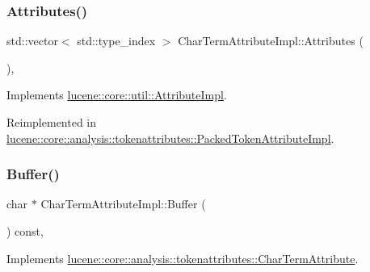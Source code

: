 \subsubsection{\texorpdfstring{Attributes()}{Attributes()}}
{\footnotesize\ttfamily std\+::vector$<$ std\+::type\+\_\+index $>$ Char\+Term\+Attribute\+Impl\+::\+Attributes (\begin{DoxyParamCaption}{ }\end{DoxyParamCaption})\hspace{0.3cm}{\ttfamily [override]}, {\ttfamily [virtual]}}



Implements \mbox{\hyperlink{classlucene_1_1core_1_1util_1_1AttributeImpl_ac0631e6a7a11044883bc97447716d7cc}{lucene\+::core\+::util\+::\+Attribute\+Impl}}.



Reimplemented in \mbox{\hyperlink{classlucene_1_1core_1_1analysis_1_1tokenattributes_1_1PackedTokenAttributeImpl_a450b5fd90cbf05268800b0f66eebb58f}{lucene\+::core\+::analysis\+::tokenattributes\+::\+Packed\+Token\+Attribute\+Impl}}.

\mbox{\label{classlucene_1_1core_1_1analysis_1_1tokenattributes_1_1CharTermAttributeImpl_af6663b6b4481ee51bd166f5c3123f9f8}} 
\subsubsection{\texorpdfstring{Buffer()}{Buffer()}}
{\footnotesize\ttfamily char $\ast$ Char\+Term\+Attribute\+Impl\+::\+Buffer (\begin{DoxyParamCaption}{ }\end{DoxyParamCaption}) const\hspace{0.3cm}{\ttfamily [override]}, {\ttfamily [virtual]}}



Implements \mbox{\hyperlink{classlucene_1_1core_1_1analysis_1_1tokenattributes_1_1CharTermAttribute_abc9fbea4b68b4cdbb1d120970c71d38e}{lucene\+::core\+::analysis\+::tokenattributes\+::\+Char\+Term\+Attribute}}.

